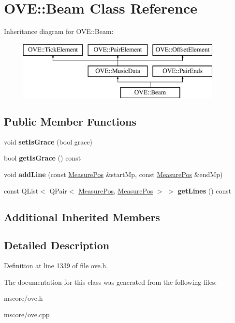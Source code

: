 \hypertarget{class_o_v_e_1_1_beam}{}\section{O\+VE\+:\+:Beam Class Reference}
\label{class_o_v_e_1_1_beam}
Inheritance diagram for O\+VE\+:\+:Beam\+:\begin{figure}[H]
\begin{center}
\leavevmode
\includegraphics[height=3.000000cm]{class_o_v_e_1_1_beam}
\end{center}
\end{figure}
\subsection*{Public Member Functions}
\begin{DoxyCompactItemize}
\item 
\mbox{\label{class_o_v_e_1_1_beam_a8bb8a66c8317c18bd5c0f193e154ef21}} 
void {\bfseries set\+Is\+Grace} (bool grace)
\item 
\mbox{\label{class_o_v_e_1_1_beam_afcc836942a686f6f76c73c01799b7c84}} 
bool {\bfseries get\+Is\+Grace} () const
\item 
\mbox{\label{class_o_v_e_1_1_beam_a9d09312458c828037d7404fe23d4b579}} 
void {\bfseries add\+Line} (const \hyperlink{class_o_v_e_1_1_measure_pos}{Measure\+Pos} \&start\+Mp, const \hyperlink{class_o_v_e_1_1_measure_pos}{Measure\+Pos} \&end\+Mp)
\item 
\mbox{\label{class_o_v_e_1_1_beam_a5ff0236ca5a1aa87c459687c3b564a91}} 
const Q\+List$<$ Q\+Pair$<$ \hyperlink{class_o_v_e_1_1_measure_pos}{Measure\+Pos}, \hyperlink{class_o_v_e_1_1_measure_pos}{Measure\+Pos} $>$ $>$ {\bfseries get\+Lines} () const
\end{DoxyCompactItemize}
\subsection*{Additional Inherited Members}


\subsection{Detailed Description}


Definition at line 1339 of file ove.\+h.



The documentation for this class was generated from the following files\+:\begin{DoxyCompactItemize}
\item 
mscore/ove.\+h\item 
mscore/ove.\+cpp\end{DoxyCompactItemize}
